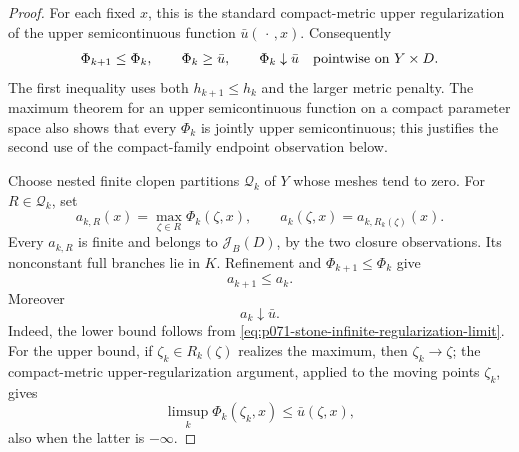 \begin{proof}
For each fixed \(x\), this is the standard compact-metric upper
regularization of the upper semicontinuous function
\(\bar u(\,\cdot\,,x)\).  Consequently
\begin{equation}
 \Phi_{k+1}\leq\Phi_k,\qquad
 \Phi_k\geq\bar u,\qquad
 \Phi_k\downarrow\bar u
 \quad\hbox{pointwise on }Y\times D.
 \label{eq:p071-stone-infinite-regularization-limit}
\end{equation}
The first inequality uses both \(h_{k+1}\leq h_k\) and the larger metric
penalty.  The maximum theorem for an upper semicontinuous function on a
compact parameter space also shows that every \(\Phi_k\) is jointly
upper semicontinuous; this justifies the second use of the compact-family
endpoint observation below.

Choose nested finite clopen partitions \(\mathscr Q_k\) of \(Y\) whose
meshes tend to zero.  For \(R\in\mathscr Q_k\), set
\begin{equation}
 a_{k,R}(x)=\max_{\zeta\in R}\Phi_k(\zeta,x),
 \qquad
 a_k(\zeta,x)=a_{k,R_k(\zeta)}(x).
 \label{eq:p071-stone-infinite-clopen-max}
\end{equation}
Every \(a_{k,R}\) is finite and belongs to \(\mathscr J_B(D)\), by the
two closure observations.  Its nonconstant full branches lie in \(K\).
Refinement and \(\Phi_{k+1}\leq\Phi_k\) give
\begin{equation}
                              a_{k+1}\leq a_k.
 \label{eq:p071-stone-infinite-clopen-decrease}
\end{equation}
Moreover
\begin{equation}
                              a_k\downarrow\bar u.
 \label{eq:p071-stone-infinite-clopen-limit}
\end{equation}
Indeed, the lower bound follows from
\eqref{eq:p071-stone-infinite-regularization-limit}.  For the upper
bound, if \(\zeta_k\in R_k(\zeta)\) realizes the maximum, then
\(\zeta_k\to\zeta\); the compact-metric upper-regularization argument,
applied to the moving points \(\zeta_k\), gives
\[
             \limsup_k\Phi_k(\zeta_k,x)\leq\bar u(\zeta,x),
\]
also when the latter is \(-\infty\).


\end{proof}

